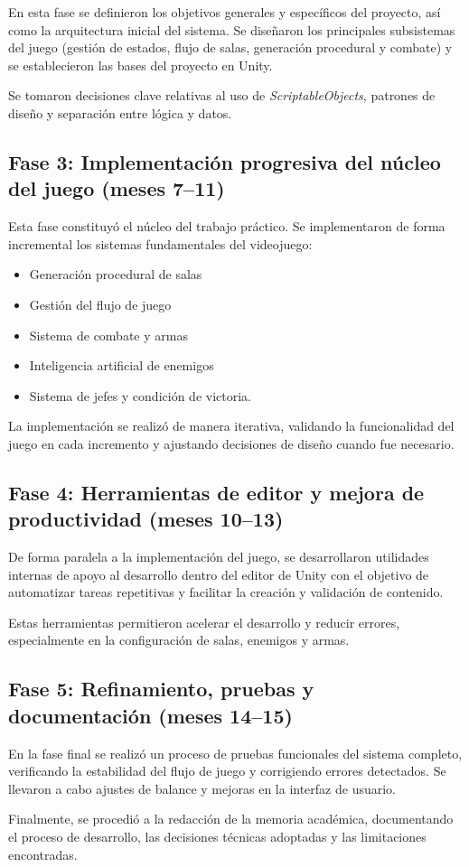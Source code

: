 En esta fase se definieron los objetivos generales y específicos del proyecto, así como la arquitectura inicial del sistema. Se diseñaron los principales subsistemas del juego (gestión de estados, flujo de salas, generación procedural y combate) y se establecieron las bases del proyecto en Unity.

Se tomaron decisiones clave relativas al uso de \textit{ScriptableObjects}, patrones de diseño y separación entre lógica y datos.

\subsection{Fase 3: Implementación progresiva del núcleo del juego (meses 7--11)}

Esta fase constituyó el núcleo del trabajo práctico. Se implementaron de forma incremental los sistemas fundamentales del videojuego:

\begin{itemize}
    \item Generación procedural de salas
    \item Gestión del flujo de juego
    \item Sistema de combate y armas
    \item Inteligencia artificial de enemigos
    \item Sistema de jefes y condición de victoria.
\end{itemize}

La implementación se realizó de manera iterativa, validando la funcionalidad del juego en cada incremento y ajustando decisiones de diseño cuando fue necesario.

\subsection{Fase 4: Herramientas de editor y mejora de productividad (meses 10--13)}

De forma paralela a la implementación del juego, se desarrollaron utilidades internas de apoyo al desarrollo dentro del editor de Unity con el objetivo de automatizar tareas repetitivas y facilitar la creación y validación de contenido.

Estas herramientas permitieron acelerar el desarrollo y reducir errores, especialmente en la configuración de salas, enemigos y armas.

\subsection{Fase 5: Refinamiento, pruebas y documentación (meses 14--15)}

En la fase final se realizó un proceso de pruebas funcionales del sistema completo, verificando la estabilidad del flujo de juego y corrigiendo errores detectados. Se llevaron a cabo ajustes de balance y mejoras en la interfaz de usuario.

Finalmente, se procedió a la redacción de la memoria académica, documentando el proceso de desarrollo, las decisiones técnicas adoptadas y las limitaciones encontradas.
